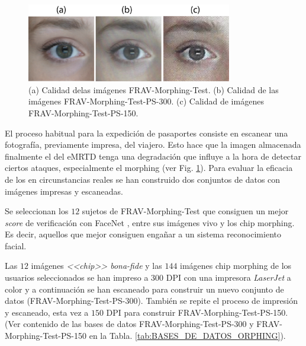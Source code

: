 \begin{figure}[ht]
     \centering
     \includegraphics[width=0.8\textwidth]{ch-sistemasABC/images/ch-morphing/CalidadImpresas.png}
     \caption{(a) Calidad delas imágenes \Gls{FRAV-Morphing-Test}. (b) Calidad de las imágenes \Gls{FRAV-Morphing-Test-PS-300}. (c) Calidad de imágenes \Gls{FRAV-Morphing-Test-PS-150}.}
     \label{fig:NOISE_PrintScan}
\end{figure}

El proceso habitual para la expedición de pasaportes consiste en escanear una fotografía, previamente impresa, del viajero. Esto hace que la imagen almacenada finalmente el  del \gls{eMRTD} tenga una degradación que influye a la hora de detectar ciertos ataques, especialmente el \gls{morphing} (ver Fig. \ref{fig:NOISE_PrintScan}). Para evaluar la eficacia de los  en circunstancias reales se han construido dos conjuntos de datos con imágenes impresas y escaneadas.

Se seleccionan los $12$ sujetos de \Gls{FRAV-Morphing-Test} que consiguen un mejor \textit{score} de verificación con \gls{FaceNet} \cite{schroff2015facenet}, entre sus imágenes \gls{vivo} y los \gls{chip} \gls{morphing}. Es decir, aquellos que mejor consiguen engañar a un sistema reconocimiento facial.

Las $12$ imágenes \textit{<<\gls{chip}>> \gls{bona-fide}} y las $144$ imágenes \gls{chip} \gls{morphing} de los usuarios seleccionados se han impreso a $300$ \gls{DPI} con una impresora \textit{LaserJet} a color y a continuación se han escaneado para construir un nuevo conjunto de datos (\Gls{FRAV-Morphing-Test-PS-300}). También se repite el proceso de impresión y escaneado, esta vez a $150$ \gls{DPI} para construir \Gls{FRAV-Morphing-Test-PS-150}. (Ver contenido de las bases de datos \Gls{FRAV-Morphing-Test-PS-300} y \Gls{FRAV-Morphing-Test-PS-150} en la Tabla. \ref{tab:BASES_DE_DATOS_ORPHING}).